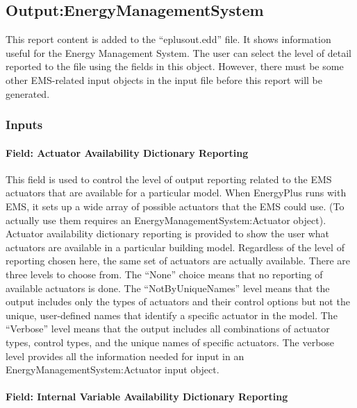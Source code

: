 \subsection{Output:EnergyManagementSystem}\label{outputenergymanagementsystem}

This report content is added to the ``eplusout.edd'' file. It shows information useful for the Energy Management System. The user can select the level of detail reported to the file using the fields in this object. However, there must be some other EMS-related input objects in the input file before this report will be generated.

\subsubsection{Inputs}\label{inputs-5-024}

\paragraph{Field: Actuator Availability Dictionary Reporting}\label{field-actuator-availability-dictionary-reporting}

This field is used to control the level of output reporting related to the EMS actuators that are available for a particular model. When EnergyPlus runs with EMS, it sets up a wide array of possible actuators that the EMS could use. (To actually use them requires an EnergyManagementSystem:Actuator object). Actuator availability dictionary reporting is provided to show the user what actuators are available in a particular building model. Regardless of the level of reporting chosen here, the same set of actuators are actually available. There are three levels to choose from. The ``None'' choice means that no reporting of available actuators is done. The ``NotByUniqueNames'' level means that the output includes only the types of actuators and their control options but not the unique, user-defined names that identify a specific actuator in the model. The ``Verbose'' level means that the output includes all combinations of actuator types, control types, and the unique names of specific actuators. The verbose level provides all the information needed for input in an EnergyManagementSystem:Actuator input object.

\paragraph{Field: Internal Variable Availability Dictionary Reporting}\label{field-internal-variable-availability-dictionary-reporting}

